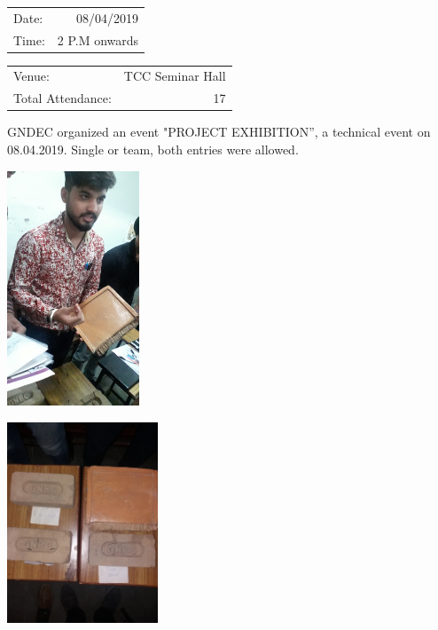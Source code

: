 \documentclass[12pt, a4 paper]{article}
\begin{document}
\begin{center}
\begin{multicols}{2}
\begin{tabular}{l r}
Date: & 08/04/2019\\ %
Time: & 2 P.M onwards \\ %
\end{tabular}

\columnbreak

\begin{tabular}{l r}
Venue: & TCC Seminar Hall \\ %
Total Attendance: & 17 \\ %
\end{tabular}
\end{multicols}

\begin{Large}
\begin{multicols}{2}
\justify
GNDEC organized an event "PROJECT EXHIBITION”, a technical event on 08.04.2019. Single or team, both entries were allowed.
\columnbreak


\includegraphics[width=\linewidth,height=7cm]{image8.jpeg}
\end{multicols}

\begin{multicols}{2}

\includegraphics[width=\linewidth,height=6cm]{image7.jpeg}


\end{multicols}
\end{Large}
\end{center}
\end{document}
